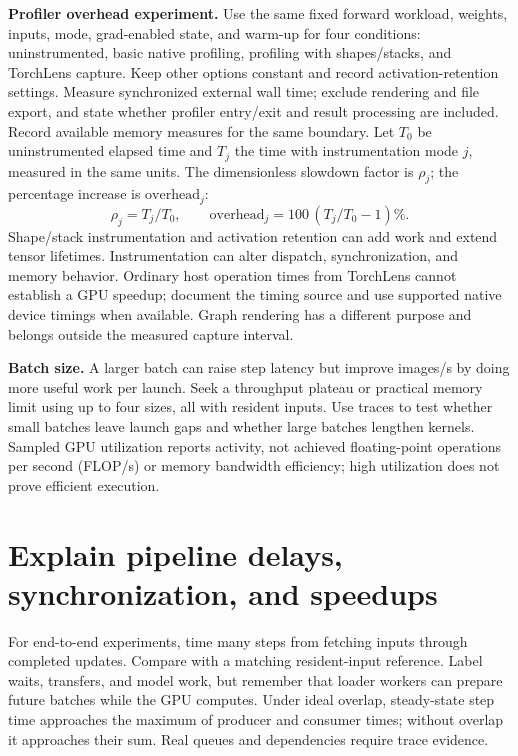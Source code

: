 \documentclass[11pt,a4paper,oneside]{report}
\newcommand{\code}[1]{\texttt{\detokenize{#1}}}
\begin{document}
\textbf{Profiler overhead experiment.} Use the same fixed forward workload,
weights, inputs, mode, grad-enabled state, and warm-up for four conditions:
uninstrumented, basic native profiling, profiling with shapes/stacks, and
TorchLens capture. Keep other options constant and record activation-retention
settings. Measure synchronized external wall time; exclude rendering and
file export, and state whether profiler entry/exit and result processing are
included. Record available memory measures for the same boundary.
Let $T_0$ be uninstrumented elapsed time and $T_j$ the time with instrumentation
mode $j$, measured in the same units. The dimensionless slowdown factor is
$\rho_j$; the percentage increase is $\text{overhead}_j$:
\begin{equation}
 \rho_j=T_j/T_0,\qquad
 \text{overhead}_j=100\,(T_j/T_0-1)\%.
\end{equation}
Shape/stack instrumentation and activation retention can add work and extend
tensor lifetimes. Instrumentation can alter dispatch, synchronization, and
memory behavior. Ordinary host operation times from TorchLens cannot establish
a GPU speedup; document the timing source and use supported native device
timings when available. Graph rendering has a different purpose and belongs
outside the measured capture interval.

\textbf{Batch size.} A larger batch can raise step latency but improve images/s
by doing more useful work per launch. Seek a throughput plateau or practical
memory limit using up to four sizes, all with resident inputs. Use traces to
test whether small batches leave launch gaps and whether large batches lengthen
kernels. Sampled GPU utilization reports activity, not achieved floating-point
operations per second (FLOP/s) or memory
bandwidth efficiency; high utilization does not prove efficient execution.

\newpage
\section{Explain pipeline delays, synchronization, and speedups}
For end-to-end experiments, time many steps from fetching inputs through
completed updates. Compare with a matching resident-input reference. Label
\code{next(loader)} waits, transfers, and model work, but remember that loader
workers can prepare future batches while the GPU computes. Under ideal overlap,
steady-state step time approaches the maximum of producer and consumer times;
without overlap it approaches their sum. Real queues and dependencies require
trace evidence.
\end{document}
